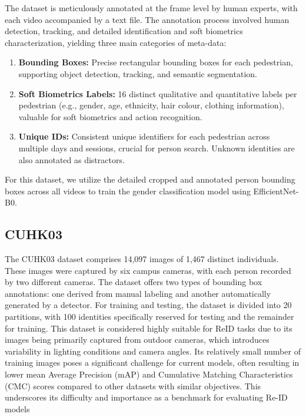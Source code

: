 The dataset is meticulously annotated at the frame level by human experts, with each video accompanied by a text file. The annotation process involved human detection, tracking, and detailed identification and soft biometrics characterization, yielding three main categories of meta-data:
\begin{enumerate}
\item \textbf{Bounding Boxes:} Precise rectangular bounding boxes for each pedestrian, supporting object detection, tracking, and semantic segmentation.
\item \textbf{Soft Biometrics Labels:} 16 distinct qualitative and quantitative labels per pedestrian (e.g., gender, age, ethnicity, hair colour, clothing information), valuable for soft biometrics and action recognition.
\item \textbf{Unique IDs:} Consistent unique identifiers for each pedestrian across multiple days and sessions, crucial for person search. Unknown identities are also annotated as distractors.
\end{enumerate}

For this dataset, we utilize the detailed cropped and annotated person bounding boxes across all videos to train the gender classification model using EfficientNet-B0.

\subsection{CUHK03}
\label{sec:cuhk03}
The CUHK03 dataset \cite{cuhk03} comprises 14,097 images of 1,467 distinct individuals. These images were captured by six campus cameras, with each person recorded by two different cameras. The dataset offers two types of bounding box annotations: one derived from manual labeling and another automatically generated by a detector. For training and testing, the dataset is divided into 20 partitions, with 100 identities specifically reserved for testing and the remainder for training. This dataset is considered highly suitable for ReID tasks due to its images being primarily captured from outdoor cameras, which introduces variability in lighting conditions and camera angles. Its relatively small number of training images poses a significant challenge for current models, often resulting in lower mean Average Precision (mAP) and Cumulative Matching Characteristics (CMC) scores compared to other datasets with similar objectives. This underscores its difficulty and importance as a benchmark for evaluating Re-ID models

